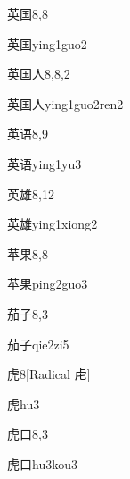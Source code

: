 \begin{entry}{英国}{8,8}
  \begin{phonetics}{英国}{ying1guo2}
  \end{phonetics}
\end{entry}

\begin{entry}{英国人}{8,8,2}
  \begin{phonetics}{英国人}{ying1guo2ren2}
  \end{phonetics}
\end{entry}

\begin{entry}{英语}{8,9}
  \begin{phonetics}{英语}{ying1yu3}
  \end{phonetics}
\end{entry}

\begin{entry}{英雄}{8,12}
  \begin{phonetics}{英雄}{ying1xiong2}
  \end{phonetics}
\end{entry}

\begin{entry}{苹果}{8,8}
  \begin{phonetics}{苹果}{ping2guo3}
  \end{phonetics}
\end{entry}

\begin{entry}{茄子}{8,3}
  \begin{phonetics}{茄子}{qie2zi5}
  \end{phonetics}
\end{entry}

\begin{entry}{虎}{8}[Radical ⾌]
  \begin{phonetics}{虎}{hu3}
  \end{phonetics}
\end{entry}

\begin{entry}{虎口}{8,3}
  \begin{phonetics}{虎口}{hu3kou3}
  \end{phonetics}
\end{entry}

